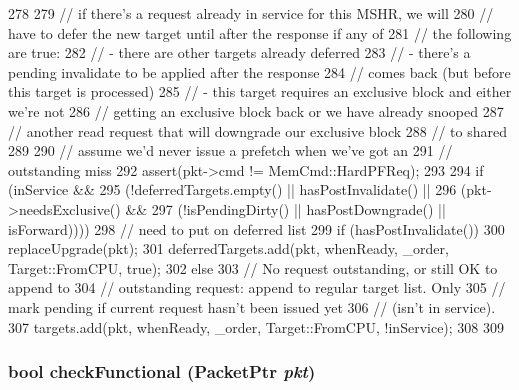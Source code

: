 \begin{DoxyCode}
278 {
279     // if there's a request already in service for this MSHR, we will
280     // have to defer the new target until after the response if any of
281     // the following are true:
282     // - there are other targets already deferred
283     // - there's a pending invalidate to be applied after the response
284     //   comes back (but before this target is processed)
285     // - this target requires an exclusive block and either we're not
286     //   getting an exclusive block back or we have already snooped
287     //   another read request that will downgrade our exclusive block
288     //   to shared
289 
290     // assume we'd never issue a prefetch when we've got an
291     // outstanding miss
292     assert(pkt->cmd != MemCmd::HardPFReq);
293 
294     if (inService &&
295         (!deferredTargets.empty() || hasPostInvalidate() ||
296          (pkt->needsExclusive() &&
297           (!isPendingDirty() || hasPostDowngrade() || isForward)))) {
298         // need to put on deferred list
299         if (hasPostInvalidate())
300             replaceUpgrade(pkt);
301         deferredTargets.add(pkt, whenReady, _order, Target::FromCPU, true);
302     } else {
303         // No request outstanding, or still OK to append to
304         // outstanding request: append to regular target list.  Only
305         // mark pending if current request hasn't been issued yet
306         // (isn't in service).
307         targets.add(pkt, whenReady, _order, Target::FromCPU, !inService);
308     }
309 }
\end{DoxyCode}
\hypertarget{classMSHR_a8eb60d4744b6212ad749f3a586759266}{
\subsubsection[{checkFunctional}]{\setlength{\rightskip}{0pt plus 5cm}bool checkFunctional ({\bf PacketPtr} {\em pkt})}}
\label{classMSHR_a8eb60d4744b6212ad749f3a586759266}



